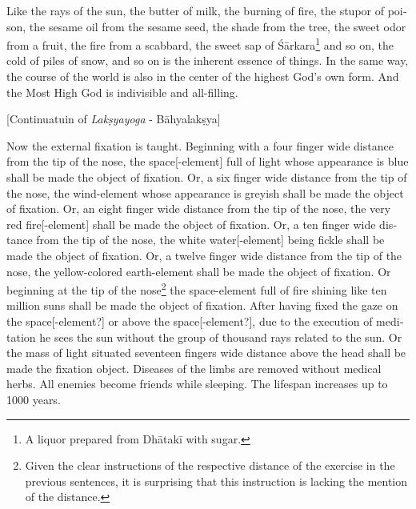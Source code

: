 \begin{otherlanguage}{english}
\begin{tlate}
Like the rays of the sun, the butter of milk, the burning of fire, the stupor of poison, the sesame oil from the sesame seed, the shade from the tree, the sweet odor from a fruit, the fire from a scabbard, the sweet sap of Śārkara\footnote{A liquor prepared from Dhātakī with sugar.} and so on, the cold of piles of snow, and so on is the inherent essence of things. In the same way, the course of the world is also in the center of the highest God's own form. And the Most High God is indivisible and all-filling.
\end{tlate}
\begin{tlate}
   \bigskip
        \centerline{\textrm{\small{[Continuatuin of \textit{Lakṣyayoga} - Bāhyalakṣya]}}}
          \bigskip
Now the external fixation is taught. Beginning with a four finger wide distance from the tip of the nose, the space[-element] full of light whose appearance is blue shall be made the object of fixation. Or, a six finger wide distance from the tip of the nose, the wind-element whose appearance is greyish shall be made the object of fixation. Or, an eight finger wide distance from the tip of the nose, the very red fire[-element] shall be made the object of fixation. Or, a ten finger wide distance from the tip of the nose, the white water[-element] being fickle shall be made the object of fixation. Or, a twelve finger wide distance from the tip of the nose, the yellow-colored earth-element shall be made the object of fixation. Or beginning at the tip of the nose\footnote{Given the clear instructions of the respective distance of the exercise in the previous sentences, it is surprising that this instruction is lacking the mention of the distance.} the space-element full of fire shining like ten million suns shall be made the object of fixation. After having fixed the gaze on the space[-element?] or above the space[-element?], due to the execution of meditation he sees the sun without the group of thousand rays related to the sun. Or the mass of light situated seventeen fingers wide distance above the head shall be made the fixation object. Diseases of the limbs are removed without medical herbs. All enemies become friends while sleeping. The lifespan increases up to 1000 years. 
\end{tlate}
\begin{tlate}

\end{tlate}
\end{otherlanguage}
